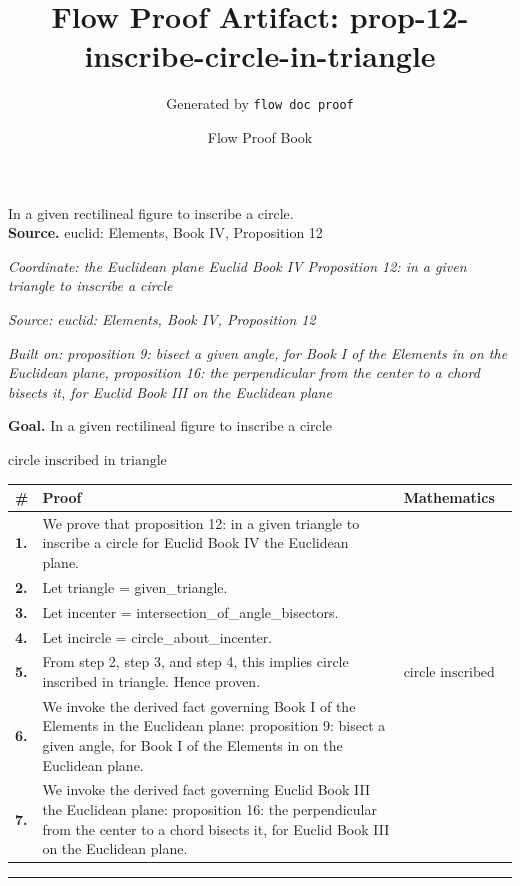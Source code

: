 \documentclass[11pt]{article}
\title{Flow Proof Artifact: prop-12-inscribe-circle-in-triangle}
\author{Generated by \texttt{flow doc proof}}
\date{Flow Proof Book}
\theoremstyle{definition}
\begin{document}
\maketitle
In a given rectilineal figure to inscribe a circle.\\[0.5em]
\textbf{Source.} euclid: Elements, Book IV, Proposition 12\\[0.5em]
\bigskip
{}\par
\smallskip\noindent\textit{Coordinate: the Euclidean plane \cdot Euclid Book IV \cdot Proposition 12: in a given triangle to inscribe a circle}\par
\smallskip\noindent\textit{Source: euclid: Elements, Book IV, Proposition 12}\par
\smallskip\noindent\textit{Built on: proposition 9: bisect a given angle, for Book I of the Elements in on the Euclidean plane, proposition 16: the perpendicular from the center to a chord bisects it, for Euclid Book III on the Euclidean plane}\par
\medskip
\noindent\textbf{Goal.} In a given rectilineal figure to inscribe a circle\par
\noindent$\displaystyle \text{circle inscribed in triangle}$\par
\medskip
\noindent
\begin{tabular}{@{} >{\raggedright\arraybackslash}p{} >{\raggedright\arraybackslash}p{} >{\raggedleft\arraybackslash}p{} @{}}
\textbf{\#} & \textbf{Proof} & \textbf{Mathematics} \\
\midrule
\textbf{1.} & We prove that proposition 12: in a given triangle to inscribe a circle for Euclid Book IV the Euclidean plane. & \\[0.45em]
\textbf{2.} & Let triangle = given\_triangle. & \\[0.45em]
\textbf{3.} & Let incenter = intersection\_of\_angle\_bisectors. & \\[0.45em]
\textbf{4.} & Let incircle = circle\_about\_incenter. & \\[0.45em]
\textbf{5.} & From step 2, step 3, and step 4, this implies circle inscribed in triangle. Hence proven. & $\displaystyle \text{circle inscribed in triangle}$ \\[0.45em]
\textbf{6.} & We invoke the derived fact governing Book I of the Elements in the Euclidean plane: proposition 9: bisect a given angle, for Book I of the Elements in on the Euclidean plane. & \\[0.45em]
\textbf{7.} & We invoke the derived fact governing Euclid Book III the Euclidean plane: proposition 16: the perpendicular from the center to a chord bisects it, for Euclid Book III on the Euclidean plane. & \\[0.45em]
\bottomrule
\end{tabular}
\label{thm:Geometry-Euclid Book IV-proposition_12_in_a_given_triangle_to_inscribe_a_circle}
\par\medskip\hrule
\end{document}

